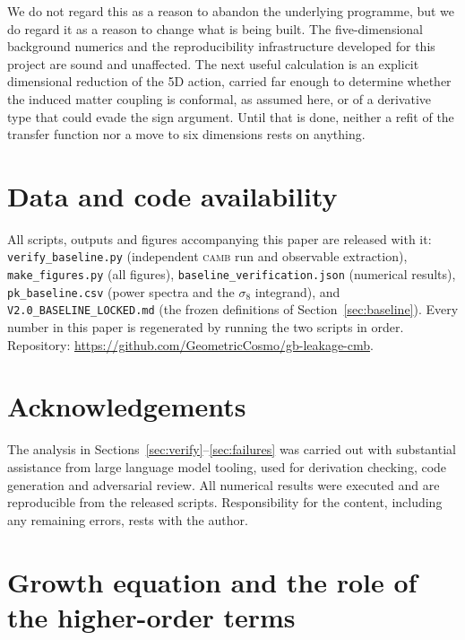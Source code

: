 \documentclass[11pt,a4paper]{article}
\begin{document}
We do not regard this as a reason to abandon the underlying programme, but we do
regard it as a reason to change what is being built. The five-dimensional background
numerics and the reproducibility infrastructure developed for this project are
sound and unaffected. The next useful calculation is an explicit dimensional
reduction of the 5D action, carried far enough to determine whether the induced
matter coupling is conformal, as assumed here, or of a derivative type that could
evade the sign argument. Until that is done, neither a refit of the transfer
function nor a move to six dimensions rests on anything.

\section*{Data and code availability}

All scripts, outputs and figures accompanying this paper are released with it:
\texttt{verify\_baseline.py} (independent \textsc{camb} run and observable
extraction), \texttt{make\_figures.py} (all figures),
\texttt{baseline\_verification.json} (numerical results),
\texttt{pk\_baseline.csv} (power spectra and the $\sigma_8$ integrand), and
\texttt{V2.0\_BASELINE\_LOCKED.md} (the frozen definitions of
Section~\ref{sec:baseline}). Every number in this paper is regenerated by running
the two scripts in order. Repository:
\url{https://github.com/GeometricCosmo/gb-leakage-cmb}.

\section*{Acknowledgements}

The analysis in Sections~\ref{sec:verify}--\ref{sec:failures} was carried out with
substantial assistance from large language model tooling, used for derivation
checking, code generation and adversarial review. All numerical results were
executed and are reproducible from the released scripts. Responsibility for the
content, including any remaining errors, rests with the author.

\newpage
\appendix

\section{Growth equation and the role of the higher-order terms}
\end{document}
